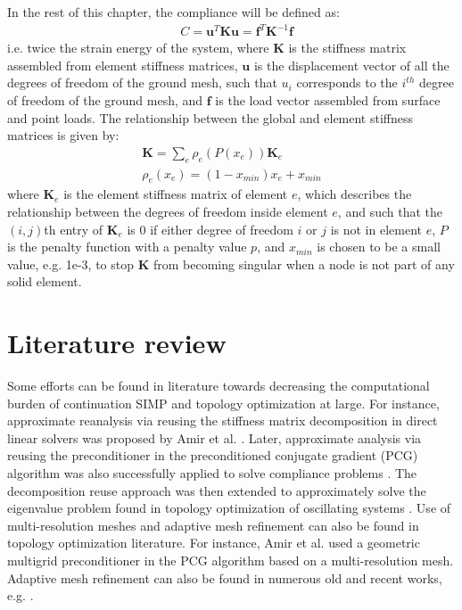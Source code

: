 In the rest of this chapter, the compliance will be defined as:
  \begin{align} \label{eqn:compliance}
    & C = \bm{u}^T\bm{K}\bm{u} = \bm{f}^T\bm{K}^{-1}\bm{f} 
  \end{align}
i.e. twice the strain energy of the system, where $\bm{K}$ is the stiffness matrix assembled from element stiffness matrices, $\bm{u}$ is the displacement vector of all the degrees of freedom of the ground mesh, such that $u_i$ corresponds to the $i^{th}$ degree of freedom of the ground mesh, and $\bm{f}$ is the load vector assembled from surface and point loads. The relationship between the global and element stiffness matrices is given by:
  \begin{gather} \label{eqn:assembly}
    \bm{K} = \sum\limits_e \rho_e(P(x_e)) \bm{K}_e \\
    \rho_e(x_e) = (1-x_{min})x_e + x_{min}
  \end{gather}
where $\bm{K}_e$ is the element stiffness matrix of element $e$, which describes the relationship between the degrees of freedom inside element $e$, and such that the $(i,j)$th entry of $\bm{K}_e$ is 0 if either degree of freedom $i$ or $j$ is not in element $e$, $P$ is the penalty function with a penalty value $p$, and $x_{min}$ is chosen to be a small value, e.g. 1e-3, to stop $\bm{K}$ from becoming singular when a node is not part of any solid element.

\section{Literature review}

Some efforts can be found in literature towards decreasing the computational burden of continuation SIMP and topology optimization at large. For instance, approximate reanalysis via reusing the stiffness matrix decomposition in direct linear solvers was proposed by Amir et al. \cite{Amir2009}. Later, approximate analysis via reusing the preconditioner in the preconditioned conjugate gradient (PCG) algorithm was also successfully applied to solve compliance problems \citep{Amir2015}. The decomposition reuse approach was then extended to approximately solve the eigenvalue problem found in topology optimization of oscillating systems \citep{Zheng2017}. Use of multi-resolution meshes and adaptive mesh refinement can also be found in topology optimization literature. For instance, Amir et al. \cite{Amir2014} used a geometric multigrid preconditioner in the PCG algorithm based on a multi-resolution mesh. Adaptive mesh refinement can also be found in numerous old and recent works, e.g. \cite{Maute1995,Maute1997,Stainko2006,Wang2010a,Wang2010a,Bruggi2011,Wang2013,Wang2014,SalazardeTroya2018,Lambe2018}.

